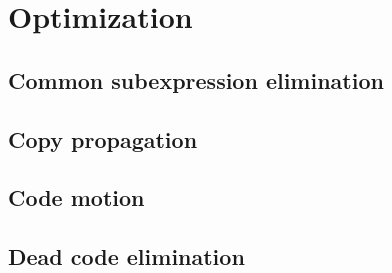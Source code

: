\section{Optimization}
\subsection{Common subexpression elimination}

\subsection{Copy propagation}

\subsection{Code motion}

\subsection{Dead code elimination}

